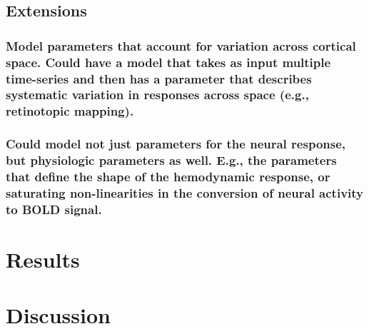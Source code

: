 \documentclass[
  man,floatsintext]{apa6}
\begin{document}
\hypertarget{extensions}{%
\subsection{Extensions}\label{extensions}}

\hypertarget{model-parameters-that-account-for-variation-across-cortical-space.-could-have-a-model-that-takes-as-input-multiple-time-series-and-then-has-a-parameter-that-describes-systematic-variation-in-responses-across-space-e.g.-retinotopic-mapping.}{%
\subsubsection{Model parameters that account for variation across cortical space. Could have a model that takes as input multiple time-series and then has a parameter that describes systematic variation in responses across space (e.g., retinotopic mapping).}\label{model-parameters-that-account-for-variation-across-cortical-space.-could-have-a-model-that-takes-as-input-multiple-time-series-and-then-has-a-parameter-that-describes-systematic-variation-in-responses-across-space-e.g.-retinotopic-mapping.}}

\hypertarget{could-model-not-just-parameters-for-the-neural-response-but-physiologic-parameters-as-well.-e.g.-the-parameters-that-define-the-shape-of-the-hemodynamic-response-or-saturating-non-linearities-in-the-conversion-of-neural-activity-to-bold-signal.}{%
\subsubsection{Could model not just parameters for the neural response, but physiologic parameters as well. E.g., the parameters that define the shape of the hemodynamic response, or saturating non-linearities in the conversion of neural activity to BOLD signal.}\label{could-model-not-just-parameters-for-the-neural-response-but-physiologic-parameters-as-well.-e.g.-the-parameters-that-define-the-shape-of-the-hemodynamic-response-or-saturating-non-linearities-in-the-conversion-of-neural-activity-to-bold-signal.}}

\hypertarget{results-1}{%
\section{Results}\label{results-1}}

\hypertarget{discussion-1}{%
\section{Discussion}\label{discussion-1}}
\end{document}
